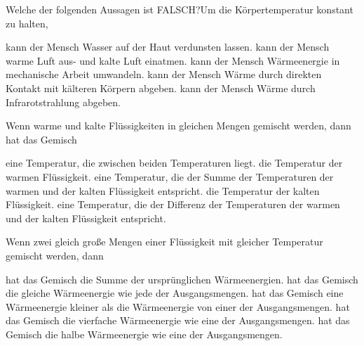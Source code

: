 \documentclass[11pt]{exam}
\begin{document}
\setlength{\voffset}{-0.5in}
\setlength{\headsep}{5pt}

\hspace{2mm}
 \hspace{5mm}
\vspace{4mm}

\begin{questions}

\question Welche der folgenden Aussagen ist FALSCH?Um die Körpertemperatur konstant zu halten,

\begin{choices}
	\choice kann der Mensch Wasser auf der Haut verdunsten lassen.
	\choice kann der Mensch warme Luft aus- und kalte Luft einatmen.
	\choice kann der Mensch Wärmeenergie in mechanische Arbeit umwandeln.
	\choice kann der Mensch Wärme durch direkten Kontakt mit kälteren Körpern abgeben.
	\choice kann der Mensch Wärme durch Infrarotstrahlung abgeben.
\end{choices}

\vspace{3mm}\question Wenn warme und kalte Flüssigkeiten in gleichen Mengen gemischt werden, dann hat das Gemisch

\begin{choices}
	\choice eine Temperatur, die zwischen beiden Temperaturen liegt.
	\choice die Temperatur der warmen Flüssigkeit.
	\choice eine Temperatur, die der Summe der Temperaturen der warmen und der kalten Flüssigkeit entspricht.
	\choice die Temperatur der kalten Flüssigkeit.
	\choice eine Temperatur, die der Differenz der Temperaturen der warmen und der kalten Flüssigkeit entspricht.
\end{choices}

\vspace{3mm}\question Wenn zwei gleich große Mengen einer Flüssigkeit mit gleicher Temperatur gemischt werden, dann

\begin{choices}
	\choice hat das Gemisch die Summe der ursprünglichen Wärmeenergien.
	\choice hat das Gemisch die gleiche Wärmeenergie wie jede der Ausgangsmengen.
	\choice hat das Gemisch eine Wärmeenergie kleiner als die Wärmeenergie von einer der Ausgangsmengen.
	\choice hat das Gemisch die vierfache Wärmeenergie wie eine der Ausgangsmengen.
	\choice hat das Gemisch die halbe Wärmeenergie wie eine der Ausgangsmengen.
\end{choices}


\end{questions}
\end{document}
